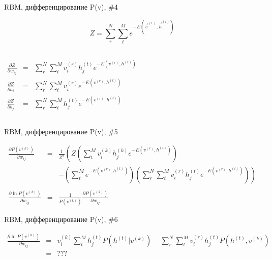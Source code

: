 \documentclass[10pt]{beamer}
\begin{document}
\begin{frame}{RBM, дифференцирование P(v), \#4}

\begin{equation*}
Z = \sum_r^N \sum_t^M e^{-E(\vec v^{(r)}, \vec h^{(t)})}
\end{equation*}

\begin{columns}

	\begin{eqnarray*}
	\frac{\partial Z}{\partial w_{ij}} &=& \sum_r^N \sum_t^M v_i^{(r)} h_j^{(t)} e^{-E( v^{(r)},  h^{(t)})} \\
	\frac{\partial Z}{\partial a_{i}} &=& \sum_r^N \sum_t^M v_i^{(r)} e^{-E( v^{(r)},  h^{(t)})} \\
	\frac{\partial Z}{\partial b_{j}} &=& \sum_r^N \sum_t^M h_j^{(t)} e^{-E( v^{(r)},  h^{(t)})}
	\end{eqnarray*}
	
\end{columns}

\end{frame}


\begin{frame}{RBM, дифференцирование P(v), \#5}

\begin{eqnarray*}
\frac{\partial P\left( v^{(k)} \right)}{\partial w_{ij}} &=& \frac{1}{Z^2} \left( Z \left( \sum_t^M v_i^{(k)} h_j^{(k)} e^{-E( v^{(r)},  h^{(t)})} \right) \right.\\
& & - \left. \left( \sum_t^M e^{-E( v^{(r)},  h^{(t)})} \right) \left( \sum_r^N \sum_t^M v_i^{(r)} h_j^{(t)} e^{-E( v^{(r)},  h^{(t)})} \right)\right) \\
& & \\
\frac{\partial \ln P\left(v^{(k)}\right)}{\partial w_{ij}} &=& \frac{1}{P\left(v^{(k)}\right)} \frac{\partial P\left(v^{(k)}\right)}{\partial w_{ij}}
\end{eqnarray*}


\end{frame}


\begin{frame}{RBM, дифференцирование P(v), \#6}

\begin{eqnarray*}
\frac{\partial \ln P\left(v^{(k)}\right)}{\partial w_{ij}} &=& v_i^{(k)} \sum_t^M h_j^{(t)} P\left( h^{(t)} | v^{(k)} \right) - \sum_r^N \sum_t^M v_i^{(r)} h_j^{(t)} P\left( h^{(t)}, v^{(k)} \right) \\
&=& ???
\end{eqnarray*}

\end{frame}
\end{document}
